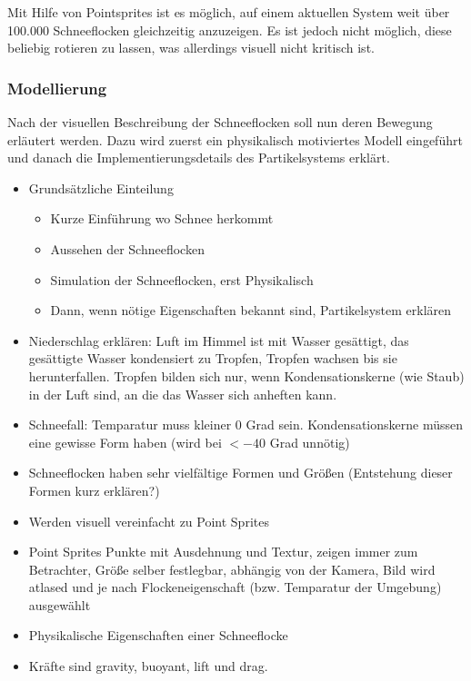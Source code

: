Mit Hilfe von Pointsprites ist es möglich, auf einem aktuellen System
weit über 100.000 Schneeflocken gleichzeitig anzuzeigen. Es ist jedoch
nicht möglich, diese beliebig rotieren zu lassen, was allerdings
visuell nicht kritisch ist.

\subsubsection{Modellierung}

Nach der visuellen Beschreibung der Schneeflocken soll nun deren
Bewegung erläutert werden. Dazu wird zuerst ein physikalisch
motiviertes Modell eingeführt und danach die Implementierungsdetails
des Partikelsystems erklärt.



\begin{itemize}
\item Grundsätzliche Einteilung
    \begin{itemize}
    \item Kurze Einführung wo Schnee herkommt
    \item Aussehen der Schneeflocken
    \item Simulation der Schneeflocken, erst Physikalisch
    \item Dann, wenn nötige Eigenschaften bekannt sind, Partikelsystem erklären
    \end{itemize}
\item Niederschlag erklären: Luft im Himmel ist mit Wasser gesättigt, das
gesättigte Wasser kondensiert zu Tropfen, Tropfen wachsen bis sie
herunterfallen. Tropfen bilden sich nur, wenn Kondensationskerne (wie Staub) in
der Luft sind, an die das Wasser sich anheften kann.
\item Schneefall: Temparatur muss kleiner 0 Grad sein. Kondensationskerne müssen
eine gewisse Form haben (wird bei $<-40$ Grad unnötig)
\item Schneeflocken haben sehr vielfältige Formen und Größen (Entstehung dieser Formen kurz erklären?)
\item Werden visuell vereinfacht zu Point Sprites
\item Point Sprites Punkte mit Ausdehnung und Textur, zeigen immer zum
Betrachter, Größe selber festlegbar, abhängig von der Kamera, Bild wird atlased
und je nach Flockeneigenschaft (bzw. Temparatur der Umgebung) ausgewählt
\item Physikalische Eigenschaften einer Schneeflocke
\item Kräfte sind gravity, buoyant, lift und drag.

\end{itemize}

